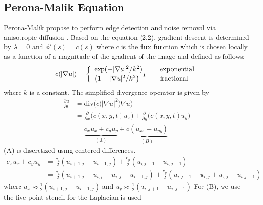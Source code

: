 \documentclass[12pt]{report}
\begin{document}
\begin{tableofcontents}
        	\section{Perona-Malik Equation}
Perona-Malik propose to perform edge detection and noise removal via anisotropic diffusion \cite{perona1990scale}. Based on the equation (2.2), gradient descent is determined by $\lambda=0$ and $\phi'(s)=c(s)$ where c is the flux function which is chosen locally as a function of a magnitude of the gradient of the image and defined as follows:
\[ c(|\nabla u|) = \left\{
  \begin{array}{l l}
    \text{exp}(-|\nabla u|^{2}/k^{2}) & \quad \text{exponential}\\
    \big(1 + |\nabla u|^2/k^2\big)^{-1} & \quad \text{fractional}
  \end{array} \right.\]
where $k$ is a constant. The simplified divergence operator is given by
			\begin{equation}
            \begin{split}
\displaystyle\frac{\partial u}{\partial t} &= \text{div}\Big(c\big(|\nabla u|^{2}\big)\nabla u\Big) \\
 &= \frac{\partial}{\partial x}\Big(c(x, y, t)u_{x}\Big)
												+ \frac{\partial}{\partial y}\Big(c(x, y, t)u_{y}\Big) \\
 &= \underbrace{c_{x}u_{x} + c_{y}u_{y}}_{(A)} + \underbrace{c(u_{xx} + u_{yy})}_{(B)}
 			\end{split}
            \end{equation}
(A) is discretized using centered differences.
			\begin{equation}
            \begin{split}
c_{x}u_{x}+c_{y}u_{y}
&= \frac{c_{x}}{2}(u_{i+1,j}-u_{i-1,j}) + \frac{c_{y}}{2}(u_{i,j+1}-u_{i,j-1}) \\
&= \frac{c_{x}}{2}(u_{i+1,j}-u_{i,j}+u_{i,j}-u_{i-1,j})
	+\frac{c_{y}}{2}(u_{i,j+1}-u_{i,j}+u_{i,j}-u_{i,j-1})
    		\end{split}
			\end{equation}
where $u_{x}\approx\frac{1}{2}(u_{i+1,j}-u_{i-1,j})$ and $u_{y}\approx\frac{1}{2}(u_{i,j+1}-u_{i,j-1})$
\newline
\newline
For (B), we use the five point stencil for the Laplacian is used.
			\begin{equation}
            \begin{split}

\end{split}
\end{equation}
\end{tableofcontents}
\end{document}
